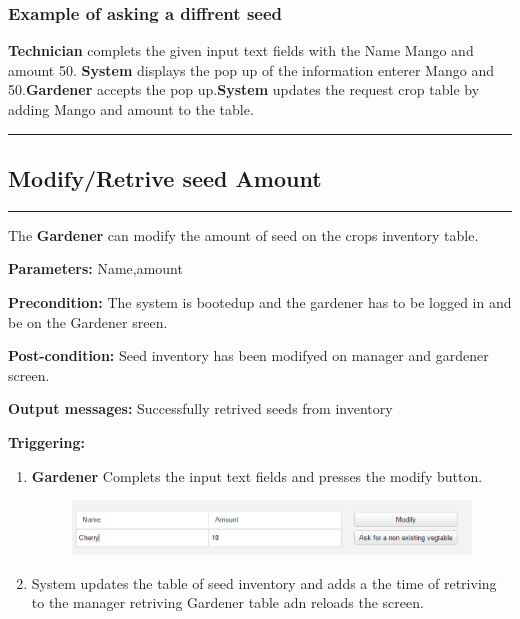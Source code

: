 \subsubsection{Example of asking a diffrent seed}
\textbf{Technician} complets the given input text fields with the Name Mango and
amount 50. \textbf{System} displays the pop up of the information enterer Mango
and 50.\textbf{Gardener} accepts the pop up.\textbf{System} updates the request
crop table by adding Mango and amount to the table.
\hfill
\vspace{0.5cm}
\hrule

\break

\subsection{Modify/Retrive seed Amount}

\hrule
\hfill
\vspace{0.5cm}
\label{operation:modifySeedAmount}


The \textbf{Gardener} can modify the amount of seed on the crops inventory
table.
\begin{description}
\item \textbf{Parameters:} Name,amount
\item \textbf{Precondition:} The system is bootedup and the gardener has to be
logged in and be on the Gardener sreen.
\item \textbf{Post-condition:} Seed inventory has been modifyed on manager and
gardener screen.
\item \textbf{Output messages:} Successfully retrived seeds from inventory
\item \textbf{Triggering:}
\begin{enumerate}
\item \textbf{Gardener} Complets the input text fields and presses the modify
button.
\begin{figure}[H]
\includegraphics[width=1\textwidth]{images/RetriveCropsBase.eps}
\end{figure}
\item System updates the table of seed inventory and adds a the time of
retriving to the manager retriving Gardener table adn reloads the screen.
\end{enumerate}
\end{description}

